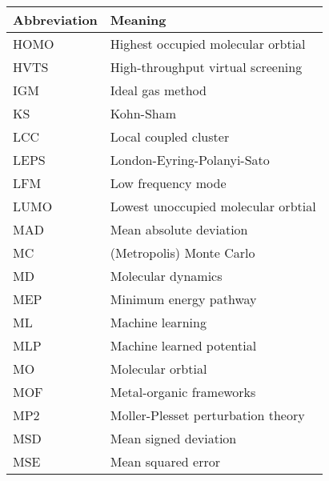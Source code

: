 \documentclass[../main.tex]{subfiles}
\begin{document}
\begin{table}[h!]
\def\arraystretch{2.0}
\begin{tabularx}{\textwidth}{YY}
Abbreviation & Meaning \\
\hline
HOMO	&	Highest occupied molecular orbtial	\\
HVTS	&	High-throughput virtual screening	\\
IGM	&	Ideal gas method	\\
KS	&	Kohn-Sham	\\
LCC	&	Local coupled cluster	\\
LEPS	&	London-Eyring-Polanyi-Sato	\\
LFM	&	Low frequency mode	\\
LUMO	&	Lowest unoccupied molecular orbtial	\\
MAD	&	Mean absolute deviation	\\
MC	&	(Metropolis) Monte Carlo	\\
MD	&	Molecular dynamics	\\
MEP	&	Minimum energy pathway	\\
ML	&	Machine learning	\\
MLP	&	Machine learned potential	\\
MO	&	Molecular orbtial	\\
MOF	&	Metal-organic frameworks	\\
MP2	&	Moller-Plesset perturbation theory	\\
MSD	&	Mean signed deviation	\\
MSE	&	Mean squared error	\\
\end{tabularx}
\end{table}
\newpage
\end{document}

